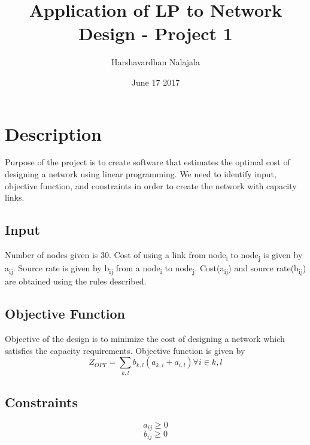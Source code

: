 \documentclass[11pt]{article}
\title{Application of LP to Network Design - Project 1}
\author{Harshavardhan Nalajala}
\date{June 17 2017}
\begin{document}
\maketitle
 \tableofcontents
 \section{Description}
 Purpose of the project is to create software that estimates the optimal cost of designing a network using linear programming.
 We need to identify input, objective function, and constraints in order to create the network with capacity links.
 \subsection{Input}
 Number of nodes given is 30. Cost of using a link from node\textsubscript{i} to node\textsubscript{j} is given by a\textsubscript{i}\textsubscript{j}. Source rate is given by b\textsubscript{i}\textsubscript{j} from a node\textsubscript{i} to node\textsubscript{j}. Cost(a\textsubscript{i}\textsubscript{j}) and source rate(b\textsubscript{i}\textsubscript{j}) are obtained using the rules described.
 \subsection{Objective Function}
Objective of the design is to minimize the cost of designing a network which satisfies the capacity requirements. Objective function is given by
\begin{equation}
	Z_{OPT} = \sum_{k,l} b_{k,l}(a_{k,i}+a_{i,l})	\forall i \in {k,l}
\end{equation}
 \subsection{Constraints}
 \begin{equation}
 	a_{ij} \geq 0
 \end{equation}
  \begin{equation}
 	b_{ij} \geq 0
 \end{equation}
\end{document}
